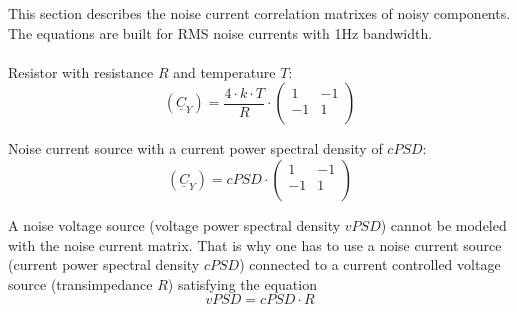 This section describes the noise current correlation matrixes of
noisy components. The equations are built for RMS noise currents
with 1Hz bandwidth.\\ \\

Resistor with resistance $R$ and temperature $T$:
\begin{equation}
(\underline{C}_Y) = \frac{4\cdot k\cdot T}{R} \cdot
\begin{pmatrix}
 1 & -1 \\
-1 &  1 \\
\end{pmatrix}
\end{equation}

Noise current source with a current power spectral density of
$cPSD$:
\begin{equation}
(\underline{C}_Y) = cPSD \cdot
\begin{pmatrix}
 1 & -1 \\
-1 &  1 \\
\end{pmatrix}
\end{equation}

A noise voltage source (voltage power spectral density $vPSD$)
cannot be modeled with the noise current
matrix. That is why one has to use a noise current source
(current power spectral density $cPSD$) connected to a current
controlled voltage source (transimpedance $R$) satisfying the
equation
\begin{equation}
vPSD = cPSD \cdot R
\end{equation}


